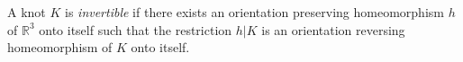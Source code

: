 A knot $K$ is \textit{invertible} if there exists an orientation preserving homeomorphism $h$ of $\mathbb{R}^3$ onto itself such that the restriction $h|K$ is an orientation reversing homeomorphism of $K$ onto itself.
